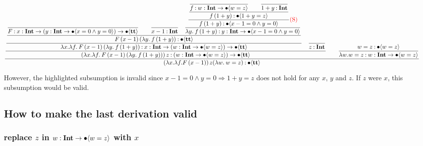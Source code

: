 \documentclass{article}
\begin{document}
\begin{equation*}
    \dfrac{
    \dfrac{
        \dfrac{
            \dfrac{
                    \dfrac{
                    }{
                    F \mathbin{:} {x} : \textbf{Int} \to ({y} : \textbf{Int} \to \bullet \langle x = 0 \wedge y = 0 \rangle) \to \bullet \langle \textbf{tt} \rangle
                    }
                    \qquad
                    \dfrac{}{
                    x - 1 \mathbin{:} \textbf{Int}
                    }
                \quad
                \dfrac{
                    \dfrac{
                        \dfrac{
                            \dfrac{}{
                                f \mathbin{:} {w} : \textbf{Int} \to \bullet \langle w=z \rangle
                            }
                            \qquad
                            \dfrac{}{
                                1+y \mathbin{:} \textbf{Int}
                            }
                        }{
                            f\,(1+y) \mathbin{:} \bullet \langle 1+y=z \rangle
                        }
                    } {
                        f\,(1+y) \mathbin{:} \bullet \langle x - 1 = 0 \wedge y = 0 \rangle
                    }\text{\textcolor{red}{(S)}}
                } {
                    \lambda y.\: f\,(1+y) \mathbin{:} {y} : \textbf{Int} \to \bullet \langle x - 1 = 0 \wedge y = 0 \rangle
                }
            }{
                F\, (x-1)\, (\lambda y.\: f\,(1+y))  \mathbin{:} \bullet \langle \textbf{tt} \rangle
            }
        }{
            \lambda x. \lambda f.\: F\, (x-1)\, (\lambda y.\: f\,(1+y)) \mathbin{:} {x} : \textbf{Int} \to ({w} : \textbf{Int} \to \bullet \langle w =z \rangle) \to \bullet \langle \textbf{tt} \rangle
        }
        \quad
        \dfrac{}{
        z \mathbin{:} \textbf{Int}
        }
        }{
            (\lambda x. \lambda f.\: F\, (x-1)\, (\lambda y.\: f\,(1+y)))\, z \mathbin{:} ({w} : \textbf{Int} \to \bullet \langle w = z \rangle) \to \bullet \langle \textbf{tt} \rangle
        }
        \qquad 
        \dfrac{
            w = z \mathbin{:} \bullet \langle  w = z \rangle
        }{
            \lambda w. w = z \mathbin{:} {w} : \textbf{Int} \to \bullet \langle w = z \rangle
        }
    }{
        (\lambda x. \lambda f. F\, (x-1))\, z (\lambda w.\: w = z) \mathbin{:} \bullet \langle \textbf{tt} \rangle
    }
\end{equation*}

However, the highlighted subsumption is invalid since \( x -1 = 0 \wedge y = 0 \Rightarrow 1 + y = z \) does not hold for any \( x \), \( y \) and \( z \).
If \( z \) were \( x \), this subsumption would be valid.

\subsection{How to make the last derivation valid}

\subsubsection{replace \( z \) in \( {w} : \textbf{Int} \to \bullet \langle w = z \rangle \) with \( x \)}
\end{document}
